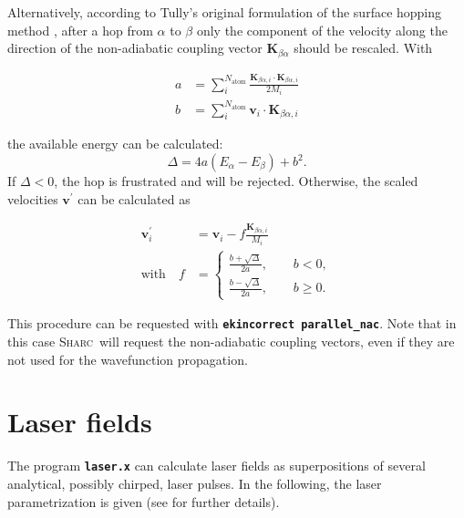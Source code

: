 \documentclass[a4paper,11pt,DIV=15,openany,twoside=false]{scrbook}
\newcommand{\ttmdump}[1]{#1}
\newcommand{\sharc}{\textsc{Sharc}}
\newcommand{\ttt}[1]{\textbf{\texttt{#1}}}
\newcommand{\VEC}[1]{\ensuremath{\mathbf{#1}}}
\begin{document}
Alternatively, according to Tully's original formulation of the surface hopping method \cite{Tully1990JCP}, after a hop from $\alpha$ to $\beta$ only the component of the velocity along the direction of the non-adiabatic coupling vector $\VEC{K}_{\beta\alpha}$ should be rescaled. With
\ttmdump{
  \begin{align}
    a&=\sum\limits_i^{N_\mathrm{atom}} \frac{\VEC{K}_{\beta\alpha, i}\cdot\VEC{K}_{\beta\alpha, i}}{2M_i}\\
    b&=\sum\limits_i^{N_\mathrm{atom}} \VEC{v}_{i}\cdot\VEC{K}_{\beta\alpha, i}
  \end{align}
}
the available energy can be calculated:
\begin{equation}
  \Delta=
  4a
  \left(
    E_\alpha-E_\beta
  \right)+b^2.
\end{equation}
If $\Delta<0$, the hop is frustrated and will be rejected. Otherwise, the scaled velocities $\VEC{v}^\prime$ can be calculated as
\ttmdump{
  \begin{align}
    \VEC{v}_i^\prime&=\VEC{v}_i-f\frac{\VEC{K}_{\beta\alpha, i}}{M_i}\\
    \mathrm{with}\quad f&=
    \begin{cases}
      \frac{b+\sqrt{\Delta}}{2a},\qquad b<0,\\
      \frac{b-\sqrt{\Delta}}{2a},\qquad b\geq 0.
    \end{cases}
  \end{align}
}
This procedure can be requested with \ttt{ekincorrect parallel\_nac}. Note that in this case \sharc\ will request the non-adiabatic coupling vectors, even if they are not used for the wavefunction propagation.


\section{Laser fields}\label{met:laser_field}

The program \ttt{laser.x} can calculate laser fields as superpositions of several analytical, possibly chirped, laser pulses. In the following, the laser parametrization is given (see \cite{Marquetand2007} for further details).
\end{document}
